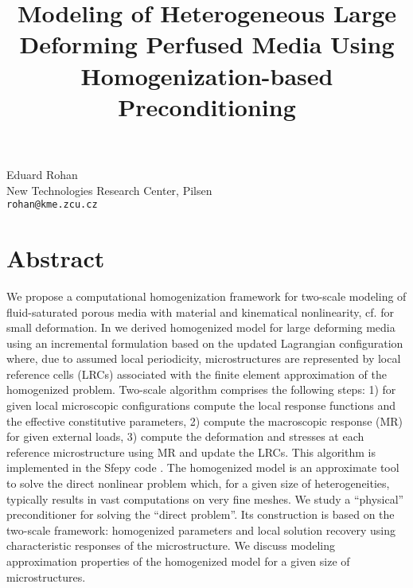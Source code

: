 \title{Modeling of Heterogeneous Large Deforming Perfused Media Using Homogenization-based Preconditioning}
 \author{} \institute{}
\maketitle
\begin{center}
{\large Eduard Rohan}\\
New Technologies Research Center, Pilsen\\
{\tt rohan@kme.zcu.cz}
\end{center}

\section*{Abstract}

We propose a computational homogenization framework for two-scale
modeling of fluid-saturated porous media with material and kinematical
nonlinearity, cf. \cite{Rohan2009-draft,RohanCimrman2009} for small deformation. In \cite{rohan-lukes-ect2010} we derived homogenized
model for large deforming media using an incremental formulation based
on the updated Lagrangian configuration where, due to assumed local
periodicity, microstructures are represented by local reference cells
(LRCs) associated with the finite element approximation of the
homogenized problem. Two-scale algorithm comprises the following
steps: 1) for given local microscopic configurations compute the local
response functions and the effective constitutive parameters, 2)
compute the macroscopic response (MR) for given external loads, 3)
compute the deformation and stresses at each reference microstructure
using MR and update the LRCs. This algorithm is implemented in the
Sfepy code \cite{sfepy}. The homogenized model is an approximate tool to solve
the direct nonlinear problem which, for a given size of
heterogeneities, typically results in vast computations on very fine
meshes. We study a ``physical'' preconditioner for solving the ``direct
problem''. Its construction is based on the two-scale framework:
homogenized parameters and local solution recovery using
characteristic responses of the microstructure. We discuss modeling approximation properties of the homogenized model for a given size of microstructures.

